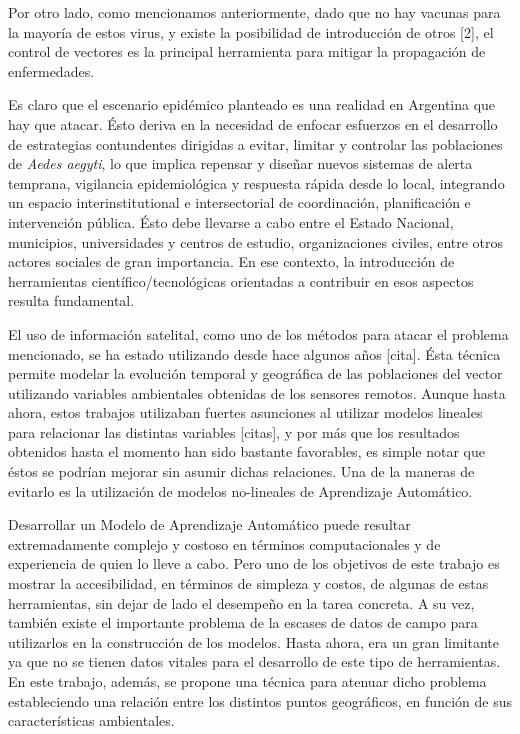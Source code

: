 \par Por otro lado, como mencionamos anteriormente, dado que no hay vacunas para la
  mayoría de estos virus, y existe la posibilidad de introducción de otros [2],
  el control de vectores es la principal herramienta para mitigar la
  propagación de enfermedades.


\par Es claro que el escenario epidémico planteado es una realidad en Argentina
  que hay que atacar. Ésto deriva en la necesidad de enfocar esfuerzos en el
  desarrollo de estrategias contundentes dirigidas a evitar, limitar y controlar
  las poblaciones de \textit{Aedes aegyti}, lo que implica repensar y diseñar
  nuevos sistemas de alerta temprana, vigilancia epidemiológica y respuesta
  rápida desde lo local, integrando un espacio interinstitutional e
  intersectorial de coordinación, planificación e intervención pública. Ésto debe
  llevarse a cabo entre el Estado Nacional, municipios, universidades y centros
  de estudio, organizaciones civiles, entre otros actores sociales de gran importancia.
  En ese contexto, la introducción de herramientas científico/tecnológicas orientadas
  a contribuir en esos aspectos resulta fundamental.

\par El uso de información satelital, como uno de los métodos para atacar el
  problema mencionado, se ha estado utilizando desde hace algunos años [cita].
  Ésta técnica permite modelar la evolución temporal y geográfica de las
  poblaciones del vector utilizando variables ambientales obtenidas de los
  sensores remotos. Aunque hasta ahora, estos trabajos utilizaban fuertes asunciones
  al utilizar modelos lineales para relacionar las distintas variables [citas], y por más
  que los resultados obtenidos hasta el momento han sido bastante
  favorables, es simple notar que éstos se podrían mejorar sin asumir dichas relaciones.
  Una de la maneras de evitarlo es la utilización de modelos no-lineales de
  Aprendizaje Automático.

\par Desarrollar un Modelo de Aprendizaje Automático puede resultar extremadamente
  complejo y costoso en términos computacionales y de experiencia de quien lo lleve
  a cabo. Pero uno de los objetivos de este trabajo es mostrar la accesibilidad,
  en términos de simpleza y costos, de algunas de estas herramientas, sin dejar
  de lado el desempeño en la tarea concreta. A su vez, también existe el importante problema
  de la escases de datos de campo para utilizarlos en la construcción de los modelos.
  Hasta ahora, era un gran limitante ya que no se tienen datos vitales
  para el desarrollo de este tipo de herramientas. En este trabajo, además, se
  propone una técnica para atenuar dicho problema estableciendo una relación
  entre los distintos puntos geográficos, en función de sus características ambientales.


